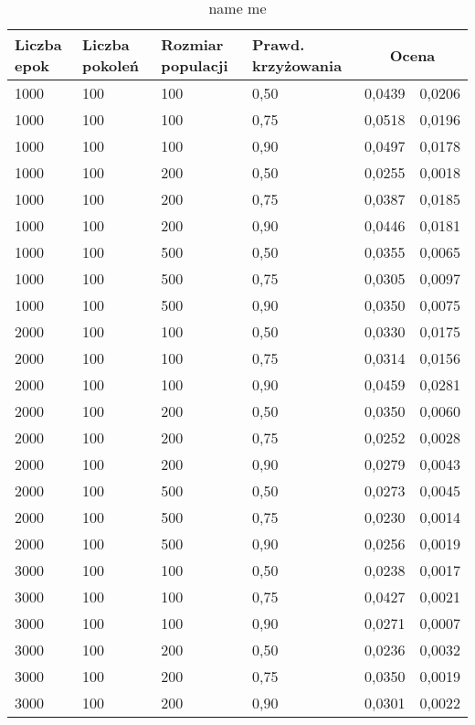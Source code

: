 \documentclass[11pt,a4paper,oneside]{report}
\begin{document}
\begin{center} 
	\begin{longtable}{|l|l|l|l|r@{$\pm$}r|}
		\caption{name me}\\
		\hline
		Liczba epok & Liczba pokoleń & Rozmiar populacji & Prawd. krzyżowania & \multicolumn{2}{|c|}{Ocena}\\ \hline \hline\endhead
		1000 & 100 & 100 & 0,50 & 0,0439 & 0,0206\\ \hline
		1000 & 100 & 100 & 0,75 & 0,0518 & 0,0196\\ \hline
		1000 & 100 & 100 & 0,90 & 0,0497 & 0,0178\\ \hline
		1000 & 100 & 200 & 0,50 & 0,0255 & 0,0018\\ \hline
		1000 & 100 & 200 & 0,75 & 0,0387 & 0,0185\\ \hline
		1000 & 100 & 200 & 0,90 & 0,0446 & 0,0181\\ \hline
		1000 & 100 & 500 & 0,50 & 0,0355 & 0,0065\\ \hline
		1000 & 100 & 500 & 0,75 & 0,0305 & 0,0097\\ \hline
		1000 & 100 & 500 & 0,90 & 0,0350 & 0,0075\\ \hline
		2000 & 100 & 100 & 0,50 & 0,0330 & 0,0175\\ \hline
		2000 & 100 & 100 & 0,75 & 0,0314 & 0,0156\\ \hline
		2000 & 100 & 100 & 0,90 & 0,0459 & 0,0281\\ \hline
		2000 & 100 & 200 & 0,50 & 0,0350 & 0,0060\\ \hline
		2000 & 100 & 200 & 0,75 & 0,0252 & 0,0028\\ \hline
		2000 & 100 & 200 & 0,90 & 0,0279 & 0,0043\\ \hline
		2000 & 100 & 500 & 0,50 & 0,0273 & 0,0045\\ \hline
		2000 & 100 & 500 & 0,75 & 0,0230 & 0,0014\\ \hline
		2000 & 100 & 500 & 0,90 & 0,0256 & 0,0019\\ \hline
		3000 & 100 & 100 & 0,50 & 0,0238 & 0,0017\\ \hline
		3000 & 100 & 100 & 0,75 & 0,0427 & 0,0021\\ \hline
		3000 & 100 & 100 & 0,90 & 0,0271 & 0,0007\\ \hline
		3000 & 100 & 200 & 0,50 & 0,0236 & 0,0032\\ \hline
		3000 & 100 & 200 & 0,75 & 0,0350 & 0,0019\\ \hline
		3000 & 100 & 200 & 0,90 & 0,0301 & 0,0022\\ \hline

\end{longtable}
\end{center}
\end{document}
